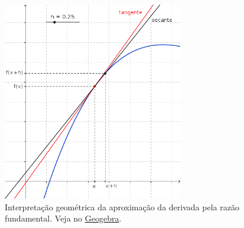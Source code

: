 \begin{figure}[hp]
  \centering
  \includegraphics[width=0.7\textwidth]{cap_deriv/dados/fig_intro_deriv/fig_intro_deriv}
  \caption{Interpretação geométrica da aproximação da derivada pela razão fundamental. Veja no \href{https://github.com/phkonzen/notas/blob/master/src/MatematicaNumerica/cap_deriv/dados/fig_intro_deriv/fig_intro_deriv.ggb}{Geogebra}.}
  \label{fig:intro_deriv}
\end{figure}


